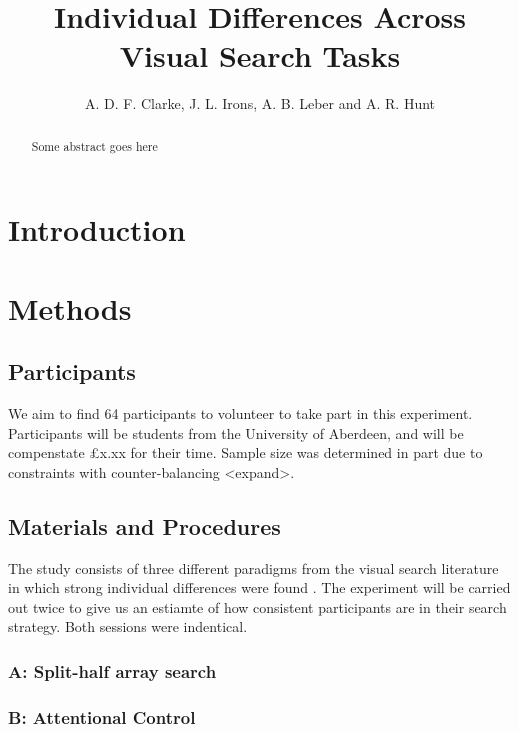 \documentclass[a4paper, oneside, 11pt, onecolumn]{article}
\begin{document}
\title{Individual Differences Across Visual Search Tasks}

\author{A. D. F. Clarke, J. L. Irons, A. B. Leber and A. R. Hunt}

\maketitle

\begin{abstract}
Some abstract goes here
\end{abstract}

\section{Introduction}


\section{Methods}


\subsection{Participants}
We aim to find 64 participants to volunteer to take part in this experiment. Participants will be students from the University of Aberdeen, and will be compenstate £x.xx for their time. Sample size was determined in part due to constraints with counter-balancing <expand>. 

\subsection{Materials and Procedures}

The study consists of three different paradigms from the visual search literature in which strong individual differences were found \citep{nowakowsak2017, irons-leber2016, kristjansson2014}. The \cite{nowakowsak2017} experiment will be carried out twice to give us an estiamte of how consistent participants are in their search strategy. Both sessions were indentical.

\subsubsection{A: Split-half array search}

\subsubsection{B: Attentional Control}
\end{document}
